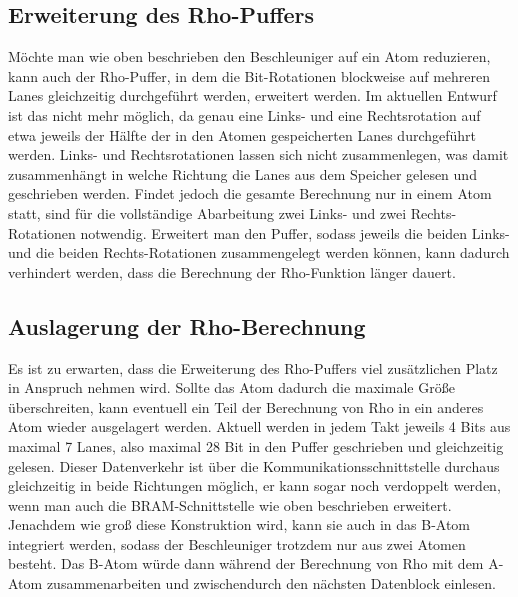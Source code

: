 \subsection{Erweiterung des Rho-Puffers}
Möchte man wie oben beschrieben den Beschleuniger auf ein Atom reduzieren, kann auch der Rho-Puffer,
in dem die Bit-Rotationen blockweise auf mehreren Lanes gleichzeitig durchgeführt werden, erweitert werden.
Im aktuellen Entwurf ist das nicht mehr möglich, da genau eine Links- und eine Rechtsrotation auf
etwa jeweils der Hälfte der in den Atomen gespeicherten Lanes durchgeführt werden.
Links- und Rechtsrotationen lassen sich nicht zusammenlegen, was damit zusammenhängt in welche
Richtung die Lanes aus dem Speicher gelesen und geschrieben werden.
Findet jedoch die gesamte Berechnung nur in einem Atom statt, sind für die vollständige Abarbeitung
zwei Links- und zwei Rechts-Rotationen notwendig. Erweitert man den Puffer, sodass jeweils die beiden Links- und die beiden Rechts-Rotationen
zusammengelegt werden können, kann dadurch verhindert werden, dass die Berechnung der Rho-Funktion länger dauert.

\subsection{Auslagerung der Rho-Berechnung}
Es ist zu erwarten, dass die Erweiterung des Rho-Puffers viel zusätzlichen Platz in Anspruch nehmen wird.
Sollte das Atom dadurch die maximale Größe überschreiten, kann eventuell ein Teil der Berechnung von Rho in ein anderes Atom wieder ausgelagert werden.
Aktuell werden in jedem Takt jeweils 4 Bits aus maximal 7 Lanes, also maximal 28 Bit in den Puffer geschrieben und gleichzeitig gelesen.
Dieser Datenverkehr ist über die Kommunikationsschnittstelle durchaus gleichzeitig in beide Richtungen möglich, er kann sogar noch verdoppelt werden,
wenn man auch die BRAM-Schnittstelle wie oben beschrieben erweitert. Jenachdem wie groß diese Konstruktion wird, kann sie auch in das B-Atom integriert werden,
sodass der Beschleuniger trotzdem nur aus zwei Atomen besteht. Das B-Atom würde dann während der Berechnung von Rho mit dem A-Atom zusammenarbeiten und
zwischendurch den nächsten Datenblock einlesen.

